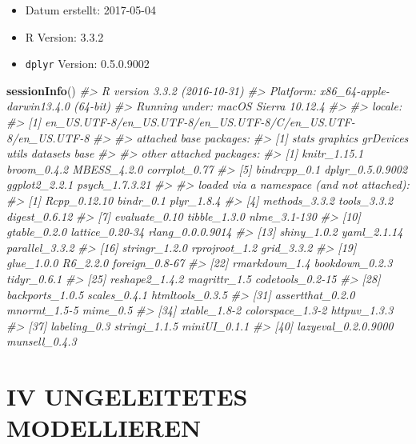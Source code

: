\documentclass[12pt,ngerman,]{book}
\makeatletter
\newenvironment{Shaded}{\begin{snugshade}}{\end{snugshade}}
\newcommand{\KeywordTok}[1]{\textcolor[rgb]{0.13,0.29,0.53}{\textbf{{#1}}}}
\newcommand{\CommentTok}[1]{\textcolor[rgb]{0.56,0.35,0.01}{\textit{{#1}}}}
\newcommand{\NormalTok}[1]{{#1}}
\providecommand{\tightlist}{%
  \setlength{\itemsep}{0pt}\setlength{\parskip}{0pt}}
\newenvironment{kframe}{%
\medskip{}
\setlength{\fboxsep}{.8em}
 \def\at@end@of@kframe{}%
 \ifinner\ifhmode%
  \def\at@end@of@kframe{\end{minipage}}%
  \begin{minipage}{\columnwidth}%
 \fi\fi%
 \def\FrameCommand##1{\hskip\@totalleftmargin \hskip-\fboxsep
 \colorbox{shadecolor}{##1}\hskip-\fboxsep
     \hskip-\linewidth \hskip-\@totalleftmargin \hskip\columnwidth}%
 \MakeFramed {\advance\hsize-\width
   \@totalleftmargin\z@ \linewidth\hsize
   \@setminipage}}%
 {\par\unskip\endMakeFramed%
 \at@end@of@kframe}
\renewenvironment{Shaded}{\begin{kframe}}{\end{kframe}}
\makeatother
\begin{document}
\begin{itemize}
\tightlist
\item
  Datum erstellt: 2017-05-04
\item
  R Version: 3.3.2
\item
  \texttt{dplyr} Version: 0.5.0.9002
\end{itemize}

\begin{Shaded}
\begin{Highlighting}[]
\KeywordTok{sessionInfo}\NormalTok{()}
\CommentTok{#> R version 3.3.2 (2016-10-31)}
\CommentTok{#> Platform: x86_64-apple-darwin13.4.0 (64-bit)}
\CommentTok{#> Running under: macOS Sierra 10.12.4}
\CommentTok{#> }
\CommentTok{#> locale:}
\CommentTok{#> [1] en_US.UTF-8/en_US.UTF-8/en_US.UTF-8/C/en_US.UTF-8/en_US.UTF-8}
\CommentTok{#> }
\CommentTok{#> attached base packages:}
\CommentTok{#> [1] stats     graphics  grDevices utils     datasets  base     }
\CommentTok{#> }
\CommentTok{#> other attached packages:}
\CommentTok{#> [1] knitr_1.15.1     broom_0.4.2      MBESS_4.2.0      corrplot_0.77   }
\CommentTok{#> [5] bindrcpp_0.1     dplyr_0.5.0.9002 ggplot2_2.2.1    psych_1.7.3.21  }
\CommentTok{#> }
\CommentTok{#> loaded via a namespace (and not attached):}
\CommentTok{#>  [1] Rcpp_0.12.10        bindr_0.1           plyr_1.8.4         }
\CommentTok{#>  [4] methods_3.3.2       tools_3.3.2         digest_0.6.12      }
\CommentTok{#>  [7] evaluate_0.10       tibble_1.3.0        nlme_3.1-130       }
\CommentTok{#> [10] gtable_0.2.0        lattice_0.20-34     rlang_0.0.0.9014   }
\CommentTok{#> [13] shiny_1.0.2         yaml_2.1.14         parallel_3.3.2     }
\CommentTok{#> [16] stringr_1.2.0       rprojroot_1.2       grid_3.3.2         }
\CommentTok{#> [19] glue_1.0.0          R6_2.2.0            foreign_0.8-67     }
\CommentTok{#> [22] rmarkdown_1.4       bookdown_0.2.3      tidyr_0.6.1        }
\CommentTok{#> [25] reshape2_1.4.2      magrittr_1.5        codetools_0.2-15   }
\CommentTok{#> [28] backports_1.0.5     scales_0.4.1        htmltools_0.3.5    }
\CommentTok{#> [31] assertthat_0.2.0    mnormt_1.5-5        mime_0.5           }
\CommentTok{#> [34] xtable_1.8-2        colorspace_1.3-2    httpuv_1.3.3       }
\CommentTok{#> [37] labeling_0.3        stringi_1.1.5       miniUI_0.1.1       }
\CommentTok{#> [40] lazyeval_0.2.0.9000 munsell_0.4.3}
\end{Highlighting}
\end{Shaded}

\chapter*{IV UNGELEITETES
MODELLIEREN}\label{iv-ungeleitetes-modellieren}
\end{document}
